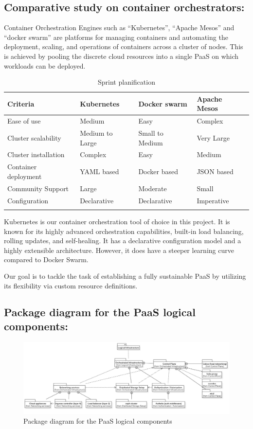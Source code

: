 \subsection{Comparative study on container orchestrators: }
Container Orchestration Engines such as “Kubernetes”, “Apache Mesos” and “docker swarm” are platforms for managing containers and automating the deployment, scaling, and operations of containers across a cluster of nodes. This is achieved by pooling the discrete cloud resources into a single PaaS on which workloads can be deployed. 

\begin{longtable}[H]{|m{3.5cm}|m{3.5cm}|m{3.5cm}|m{3.5cm}|}
\hline
Criteria & Kubernetes & Docker swarm & Apache Mesos  \\
\hline
Ease of use & Medium & Easy & Complex  \\
\hline
Cluster scalability & Medium to Large & Small to Medium & Very Large  \\
\hline
Cluster installation & Complex & Easy & Medium  \\
\hline
Container deployment & YAML based  & Docker based & JSON based \\
\hline
Community Support  & Large  & Moderate  & Small \\
\hline
Configuration & Declarative  & Declarative & Imperative \\
\hline
\caption{Sprint planification}
\end{longtable}

Kubernetes is our container orchestration tool of choice in this project. It is known for its highly advanced orchestration capabilities, built-in load balancing, rolling updates, and self-healing. It has a declarative configuration model and a highly extensible architecture. However, it does have a steeper learning curve compared to Docker Swarm.  

Our goal is to tackle the task of establishing a fully sustainable PaaS by utilizing its flexibility via custom resource definitions. 

\subsection{Package diagram for the PaaS logical components:}

\begin{figure}[H]\centering
\includegraphics[width=1.0\textwidth,angle=00]{assets/f12.jpg}
\caption{Package diagram for the PaaS logical components}
\label{fig:Package diagram for the PaaS logical components}
\end{figure}

